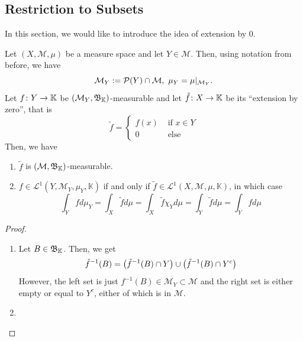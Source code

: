 \documentclass[11pt,leqno,oneside]{amsbook}
\numberwithin{thm}{section}
\renewcommand{\P}{\mathcal{P}}
\newcommand{\M}{\mathcal{M}}
\newcommand{\cL}{\mathcal{L}}
\newcommand{\K}{\mathbb{K}} %
\begin{document}
\subsection{Restriction to Subsets}
In this section, we would like to introduce the idea of extension by
0.
\begin{prop}
  Let \((X,\M,\mu)\) be a measure space and let \(Y \in \M\). Then,
  using notation from before, we have \[
    \M_Y := \P(Y) \intersect \M, \ \mu_Y = \mu|_{\M_Y}.
  \]
  Let \(f \from Y \to \K\) be \((\M_Y,\B_\K)\)-measurable and let
  \(\tilde{f} \from X \to \K\) be its ``extension by zero'', that
  is \[
    \tilde{f} =
    \begin{cases}
      f(x) & \text{ if }x \in Y \\
      0 & \text{ else }
    \end{cases}
  \]
  Then, we have
  \begin{enumerate}
  \item \(\tilde{f}\) is \((\M,\B_\K)\)-measurable.
  \item \(f \in \cL^1(Y,\M_Y,\mu_Y,\K)\) if and only if \(\tilde{f}
    \in \cL^1(X,\M,\mu,\K)\), in which case \[
      \int_Y f d\mu_Y = \int_X \tilde{f} d\mu = \int_X \tilde{f}
      \chi_Y d\mu = \int_Y \tilde{f} d\mu = \int_Y f d\mu
    \]
  \end{enumerate}
\end{prop}
\begin{proof}
  \begin{enumerate}
  \item Let \(B \in \B_\K\). Then, we get \[
      \tilde{f}^{-1}(B) = \left( \tilde{f}^{-1}(B) \cap Y
      \right) \cup \left( \tilde{f}^{-1}(B) \cap Y^c \right)
    \]
    However, the left set is just \(f^{-1}(B) \in \M_Y \subset \M\)
    and the right set is either empty or equal to \(Y^c\), either of
    which is in \(\M\).
  \item 
  \end{enumerate}
\end{proof}
\end{document}
